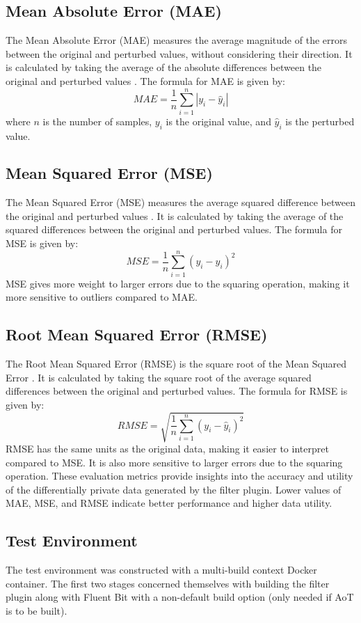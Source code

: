 \subsection{Mean Absolute Error (MAE)}
The Mean Absolute Error (MAE) measures the average magnitude of the errors between the original and perturbed values, without considering their direction. It is calculated by taking the average of the absolute differences between the original and perturbed values \cite{Willmott2005}. The formula for MAE is given by:
\begin{equation}
MAE = \frac{1}{n} \sum_{i=1}^{n} |y_i - \hat{y}_i|
\end{equation}
where $n$ is the number of samples, $y_i$ is the original value, and $\hat{y}_i$ is the perturbed value.
\subsection{Mean Squared Error (MSE)}
The Mean Squared Error (MSE) measures the average squared difference between the original and perturbed values \cite{ZhouWang2009}. It is calculated by taking the average of the squared differences between the original and perturbed values. The formula for MSE is given by:
\begin{equation}
MSE = \frac{1}{n} \sum_{i=1}^{n} (y_i - \hat{y}_i)^2
\end{equation}
MSE gives more weight to larger errors due to the squaring operation, making it more sensitive to outliers compared to MAE.
\subsection{Root Mean Squared Error (RMSE)}
The Root Mean Squared Error (RMSE) is the square root of the Mean Squared Error \cite{Chai2014}. It is calculated by taking the square root of the average squared differences between the original and perturbed values. The formula for RMSE is given by:
\begin{equation}
RMSE = \sqrt{\frac{1}{n} \sum_{i=1}^{n} (y_i - \hat{y}_i)^2}
\end{equation}
RMSE has the same units as the original data, making it easier to interpret compared to MSE. It is also more sensitive to larger errors due to the squaring operation.
These evaluation metrics provide insights into the accuracy and utility of the differentially private data generated by the filter plugin. Lower values of MAE, MSE, and RMSE indicate better performance and higher data utility.
\subsection{Test Environment}
The test environment was constructed with a multi-build context Docker container. The first two stages concerned themselves with building the filter plugin along with Fluent Bit with a non-default build option (only needed if AoT is to be built).
